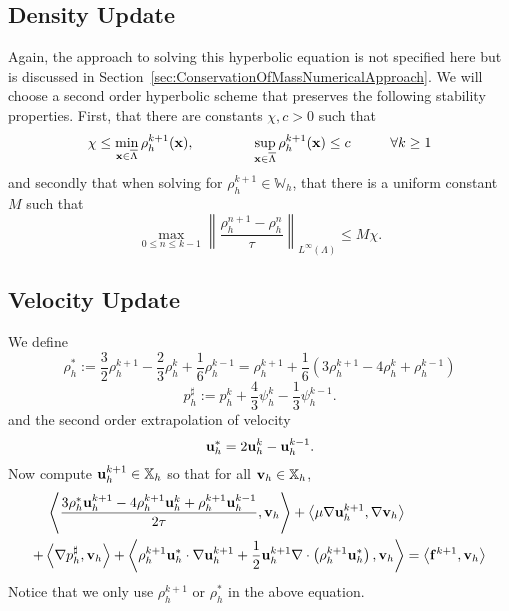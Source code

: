 \documentclass[letterpaper]{erdc}
\begin{document}
%
%
\subsection{Density Update}
Again, the approach to solving this hyperbolic equation is not specified here but is discussed in Section~\ref{sec:ConservationOfMassNumericalApproach}.  We will choose a second order hyperbolic scheme that preserves the following stability properties.  First, that there are constants $\chi, c > 0$ such that 
\begin{equation}
  \chi \leq \displaystyle\min_{\textbf{x}\in\overline{\Lambda}} \rho_h^{k+1}(\textbf{x}),  \hspace{1.5cm} \displaystyle\sup_{\textbf{x}\in\overline{\Lambda}}\rho_h^{k+1}(\textbf{x}) \leq c \hspace{1cm} \forall k\geq 1
\end{equation}
and secondly that when solving for $\rho_h^{k+1}\in \mathbb{W}_h$, that there is a uniform constant $M$ such that
\begin{equation}
  \displaystyle\max_{0\leq n\leq k-1} \left \| \frac{\rho_h^{n+1} - \rho_h^{n}}{\tau}\right\|_{L^{\infty}(\Lambda)} \leq M\chi.
\end{equation}

%
%
\subsection{Velocity Update}
We define
\begin{equation}
  \rho_h^{*} := \frac{3}{2}\rho_h^{k+1} - \frac{2}{3}\rho_h^{k} + \frac{1}{6}\rho_h^{k-1} = \rho_h^{k+1} + \frac{1}{6}\left(3\rho_h^{k+1} -4\rho_h^{k} + \rho_h^{k-1} \right)
\end{equation}
\begin{equation}
  p_h^{\sharp} := p_h^{k} + \frac{4}{3}\psi_h^{k} - \frac{1}{3}\psi_h^{k-1}.
\end{equation}
and the second order extrapolation of velocity
\begin{equation}\label{eq:velocityextrapolation_uniformtimestep}
  \textbf{u}^{*}_h = 2\textbf{u}_h^{k}  - \textbf{u}_h^{k-1}.
\end{equation}
Now compute $\textbf{u}_h^{k+1}\in\mathbb{X}_h$ so that for all $\textbf{v}_h\in\mathbb{X}_h$,
\begin{equation}\label{eqn:bdf2lessrecognizableform}
  \begin{split}
    \left\langle \frac{3\rho_h^{*}\textbf{u}_h^{k+1} - 4\rho_h^{k+1}\textbf{u}_h^{k} + \rho_h^{k+1}\textbf{u}_h^{k-1}}{2\tau}, \textbf{v}_h \right\rangle  + \left\langle \mu\nabla\textbf{u}_h^{k+1}, \nabla\textbf{v}_h \right\rangle &\\
   + \left\langle \nabla p_h^{\sharp}, \textbf{v}_h \right\rangle + \left\langle \rho_h^{k+1}\textbf{u}_h^{*}\cdot\nabla\textbf{u}_h^{k+1} + \frac{1}{2}\textbf{u}_h^{k+1}\nabla\cdot\left( \rho_h^{k+1}\textbf{u}_h^{*} \right), \textbf{v}_h \right\rangle &= \left\langle \mathbf{f}^{k+1}, \textbf{v}_h \right\rangle
  \end{split}
\end{equation}
Notice that we only use $\rho_h^{k+1}$ or $\rho_h^{*}$ in the above equation.
\end{document}
